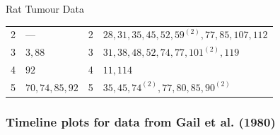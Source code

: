 \documentclass[oneside]{book}\usepackage[]{graphicx}\usepackage[svgnames]{xcolor}
\begin{document}
\begin{Example}{Rat Tumour Data}
\begin{center}
\begin{NiceTabular}{clcl}
            2                            & ---                      & 2                          & $28, 31, 35, 45, 52, 59^{(2)} , 77, 85, 107, 112$ \\
            3                            & $3,88$                   & 3                          & $31, 38, 48, 52, 74, 77, 101^{(2)} , 119$         \\
            4                            & $92$                     & 4                          & $ 11, 114  $                                \\
            5                            & $70,74,85,92$            & 5                          & $35,45,74^{(2)},77,80,85,90^{(2)}$              \\
            \bottomrule
        \end{NiceTabular}
    \end{center}
\end{Example}
\subsubsection*{Timeline plots for data from Gail et al. (1980)}
\end{document}
